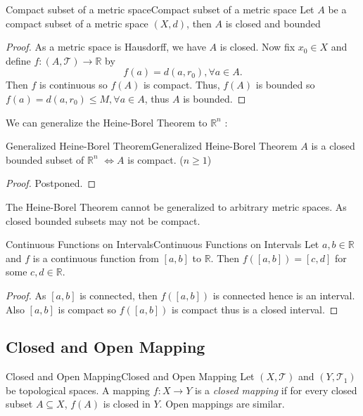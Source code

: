 \documentclass[../main.tex]{subfiles}
\begin{document}
\begin{theorem}{Compact subset of a metric space}{Compact subset of a metric space}
Let $A$ be a compact subset of a metric space $(X,d)$, then $A$ is closed and bounded
\end{theorem}
\begin{proof}
As a metric space is Hausdorff, we have $A$ is closed. Now fix $x_0\in X$ and define $f: (A,\mathcal{T}) \rightarrow \mathbb{R}$ by
\begin{equation*}
f(a) = d(a,r_0), \forall a\in A.
\end{equation*}
Then $f$ is continuous so $f(A)$ is compact. Thus, $f(A)$ is bounded so $f(a)=d(a,r_0) \leq M,\forall a\in A$, thus $A$ is bounded.
\end{proof}

We can generalize the Heine-Borel Theorem to $\mathbb{R}^n$ :

\begin{theorem}{Generalized Heine-Borel Theorem}{Generalized Heine-Borel Theorem}
$A$ is a closed bounded subset of $\mathbb{R}^n$ $\Leftrightarrow A$ is compact. ($n \geq 1$)
\end{theorem}
\begin{proof}
Postponed.
\end{proof}

\begin{remark}
The Heine-Borel Theorem cannot be generalized to arbitrary metric spaces. As closed bounded subsets may not be compact.
\end{remark}

\begin{proposition}{Continuous Functions on Intervals}{Continuous Functions on Intervals}
	Let $a, b\in \mathbb{R}$ and $f$ is a continuous function from $[a,b]$ to $\mathbb{R}$. Then $f([a,b]) = [c,d]$ for some $c,d\in \mathbb{R}$.
\end{proposition}
\begin{proof}
	As $[a,b]$ is connected, then $f([a,b])$ is connected hence is an interval. Also $[a,b]$ is compact so $f([a,b])$ is compact thus is a closed interval.
\end{proof}

\subsection{Closed and Open Mapping}
\begin{definition}{Closed and Open Mapping}{Closed and Open Mapping}
Let $(X,\mathcal{T})$ and $(Y,\mathcal{T}_1)$ be topological spaces. A mapping $f:X \rightarrow Y$ is a \emph{closed mapping} if for every closed subset $A \subseteq X$, $f(A)$ is closed in $Y$. Open mappings are similar.
\end{definition}
\end{document}
